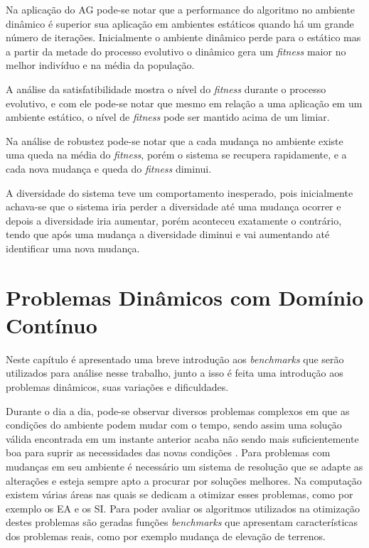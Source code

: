 Na aplicação do AG pode-se notar que a performance do algoritmo no ambiente dinâmico é superior sua aplicação em ambientes estáticos quando há um grande número de iterações. Inicialmente o ambiente dinâmico perde para o estático mas a partir da metade do processo evolutivo o dinâmico gera um \textit{fitness} maior no melhor indivíduo e na média da população.

A análise da satisfatibilidade mostra o nível do \textit{fitness} durante o processo evolutivo, e com ele pode-se notar que mesmo em relação a uma aplicação em um ambiente estático, o nível de \textit{fitness} pode ser mantido acima de um limiar.

Na análise de robustez pode-se notar que a cada mudança no ambiente existe uma queda na média do \textit{fitness}, porém o sistema se recupera rapidamente, e a cada nova mudança e queda do \textit{fitness} diminui.

A diversidade do sistema teve um comportamento inesperado, pois inicialmente achava-se que o sistema iria perder a diversidade até uma mudança ocorrer e depois a diversidade iria aumentar, porém aconteceu exatamente o contrário, tendo que após uma mudança a diversidade diminui e vai aumentando até identificar uma nova mudança.

\section{Problemas Dinâmicos com Domínio Contínuo}
\label{sec:problemas}
Neste capítulo é apresentado uma breve introdução aos \textit{benchmarks} que serão utilizados para análise nesse trabalho, junto a isso é feita uma introdução aos problemas dinâmicos, suas variações e dificuldades.

Durante o dia a dia, pode-se observar diversos problemas complexos em que as condições do ambiente podem mudar com o tempo, sendo assim uma solução válida encontrada em um instante anterior acaba não sendo mais suficientemente boa para suprir as necessidades das novas condições \cite{branke2012evolutionary}. Para problemas com mudanças em seu ambiente é necessário um sistema de resolução que se adapte as alterações e esteja sempre apto a procurar por soluções melhores. Na computação existem várias áreas nas quais se dedicam a otimizar esses problemas, como por exemplo os EA e os SI. Para poder avaliar os algoritmos utilizados na otimização destes problemas são geradas funções \textit{benchmarks} que apresentam características dos problemas reais, como por exemplo mudança de elevação de terrenos.

